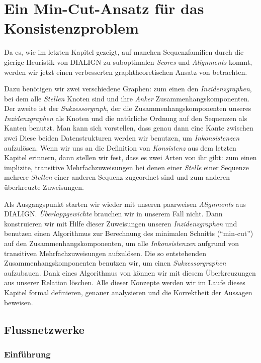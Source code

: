 \chapter{Ein Min-Cut-Ansatz für das Konsistenzproblem}
\label{ch:min-cut}
Da es, wie im letzten Kapitel gezeigt, auf manchen Sequenzfamilien durch die gierige Heuristik von DIALIGN zu suboptimalen \emph{Scores} und \emph{Alignments} kommt, werden wir jetzt einen verbesserten graphtheoretischen Ansatz von \cite{cpm10} betrachten.

Dazu benötigen wir zwei verschiedene Graphen: zum einen den \emph{Inzidenzgraphen}, bei dem alle \emph{Stellen} Knoten sind und ihre \emph{Anker} Zusammenhangskomponenten. Der zweite ist der \emph{Sukzessorgraph}, der die Zusammenhangskomponenten unseres \emph{Inzidenzgraphen} als Knoten und die natürliche Ordnung auf den Sequenzen als Kanten benutzt. Man kann sich vorstellen, dass genau dann eine Kante zwischen zwei  Diese beiden Datenstrukturen werden wir benutzen, um \emph{Inkonsistenzen} aufzulösen. Wenn wir uns an die Definition von \emph{Konsistenz} aus dem letzten Kapitel erinnern, dann stellen wir fest, dass es zwei Arten von ihr gibt: zum einen implizite, transitive Mehrfachzuweisungen bei denen einer \emph{Stelle} einer Sequenze mehrere \emph{Stellen} einer anderen Sequenz zugeordnet sind und zum anderen überkreuzte Zuweisungen.

Als Ausgangspunkt starten wir wieder mit unseren paarweisen \emph{Alignments} aus DIALIGN. \emph{Überlappgewichte} brauchen wir in unserem Fall nicht. Dann konstruieren wir mit Hilfe dieser Zuweisungen unseren \emph{Inzidenzgraphen} und benutzen einen Algorithmus zur Berechnung des minimalen Schnitts (\enquote{min-cut}) auf den Zusammenhangskomponenten, um alle \emph{Inkonsistenzen} aufgrund von transitiven Mehrfachzuweisungen aufzulösen. Die so entstehenden Zusammenhangskomponenten benutzen wir, um einen \emph{Sukzessorgraphen} aufzubauen. Dank eines Algorithmus von \cite{pdc10} können wir mit diesem Überkreuzungen aus unserer Relation löschen. Alle dieser Konzepte werden wir im Laufe dieses Kapitel formal definieren, genauer analysieren und die Korrektheit der Aussagen beweisen.
 
\section{Flussnetzwerke}

\subsection{Einführung}

